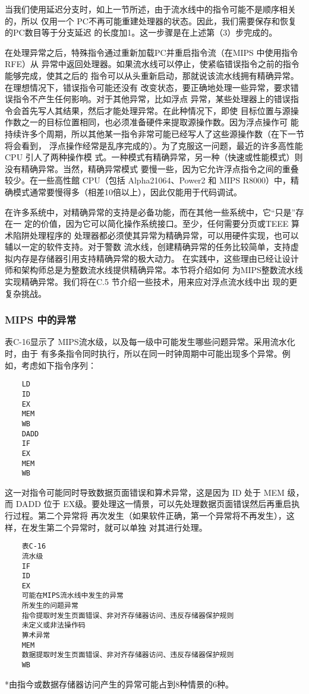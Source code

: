 当我们使用延迟分支时，如上一节所述，由于流水线中的指令可能不是顺序相关的，所以
仅用一个 PC不再可能重建处理器的状态。因此，我们需要保存和恢复的PC数目等于分支延迟
的长度加1。这一步骤是在上述第（3）步完成的。

在处理异常之后，特殊指令通过重新加载PC并重启指令流（在MIPS 中使用指令 RFE）从
异常中返回处理器。如果流水线可以停止，使紧临错误指令之前的指令能够完成，使其之后的
指令可以从头重新启动，那就说该流水线拥有精确异常。在理想情况下，错误指令可能还没有
改变状态，要正确地处理一些异常，要求错误指令不产生任何影响。对于其他异常，比如浮点
异常，某些处理器上的错误指令会首先写人其结果，然后才能处理异常。在此种情况下，即使
目标位置与源操作数之一的目标位置相同，也必须准备硬件来提取源操作数。因为浮点操作可
能持续许多个周期，所以其他某一指令非常可能已经写人了这些源操作数（在下一节将会看到，
浮点操作经常是乱序完成的）。为了克服这一问题，最近的许多高性能 CPU 引人了两种操作模
式。一种模式有精确异常，另一种（快速或性能模式）则没有精确异常。当然，精确异常模式
要慢一些，因为它允许浮点指令之间的重叠较少。在一些高性館 CPU（包括 Alpha21064、Power2
和 MIPS R8000）中，精确模式通常要慢得多（相差10倍以上），因此仅能用于代码调试。

在许多系统中，对精确异常的支持是必备功能，而在其他一些系统中，它“只是”存在一
定的价值，因为它可以简化操作系统接口。至少，任何需要分页或TEEE 算术陷阱处理程序的
处理器都必须使其异常为精确异常，可以用硬件实现，也可以辅以一定的软件支持。对于警数
流水线，创建精确异常的任务比较简单，支持虚拟内存是存储器引用支持精确异常的极大动力。
在实践中，这些理由已经让设计师和架构师总是为整数流水线提供精确异常。本节将介绍如何
为MIPS整数流水线实现精确异常。我们将在C.5 节介绍一些技术，用来应对浮点流水线中出
现的更复杂挑战。

\subsubsection{MIPS 中的异常}
表C-16显示了 MIPS流水级，以及每一级中可能发生哪些问题异常。采用流水化时，由于
有多条指令同时执行，所以在同一时钟周期中可能出现多个异常。例如，考虑如下指令序列：
\begin{verbatim}
    LD
    ID
    EX
    MEM
    WB
    DADD
    IF
    EX
    MEM
    WB
\end{verbatim}
这一对指令可能同时导致数据页面错误和算术异常，这是因为 ID 处于 MEM 级，而 DADD
位于 EX级。要处理这一情景，可以先处理数据页面错误然后再重启执行过程。第二个异常将
再次发生（如果软件正确，第一个异常将不再发生），这样，在发生第二个异常时，就可以单独
对其进行处理。

\begin{verbatim}
    表C-16
    流水级
    IF
    ID
    EX
    可能在MIPS流水线中发生的异常
    所发生的问题异常
    指令提取时发生页面错误、非对齐存储器访问、违反存储器保护规则
    未定义或非法操作码
    箅术异常
    MEM
    数据提取时发生页面错误、非对齐存储器访问、违反存储器保护规则
    WB
\end{verbatim}
*由指今或数据存储器访问产生的异常可能占到8种情景的6种。

